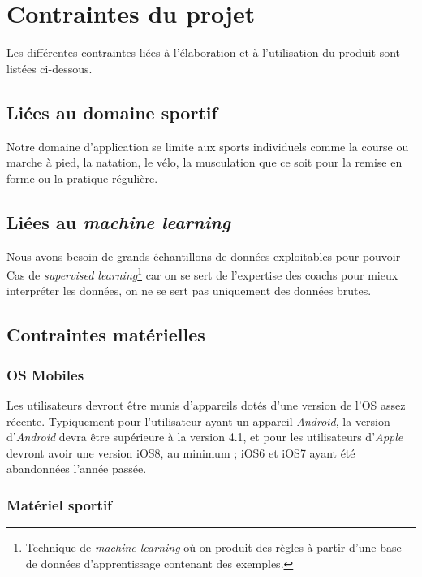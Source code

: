 \chapter{Contraintes du projet}

Les différentes contraintes liées à l'élaboration et à l'utilisation du produit sont listées ci-dessous.

\section{Liées au domaine sportif}

Notre domaine d'application se limite aux sports individuels comme la course ou marche à pied, la natation, le vélo, la musculation que ce soit pour la remise en forme ou la pratique régulière.

\section{Liées au \textit{machine learning}}

Nous avons besoin de grands échantillons de données exploitables pour pouvoir 
Cas de \textit{supervised learning}\footnote{Technique de \textit{machine learning} où on produit des règles à partir d'une base de données d'apprentissage contenant des exemples.} car on se sert de l'expertise des coachs pour mieux interpréter les données, on ne se sert pas uniquement des données brutes.

\section{Contraintes matérielles}

\subsection*{OS Mobiles}

Les utilisateurs devront être munis d'appareils dotés d'une version de l'OS assez récente. Typiquement pour l'utilisateur ayant un appareil \textit{Android}, la version d'\textit{Android} devra être supérieure à la version 4.1, et pour les utilisateurs d'\textit{Apple} devront avoir une version iOS8, au minimum ; iOS6 et iOS7 ayant été abandonnées l'année passée.

\subsection*{Matériel sportif}

